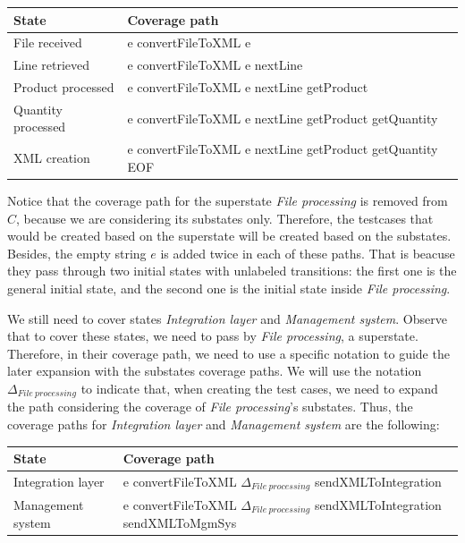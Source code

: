 \begin{center}
\begin{tabular}{| l | l|}

\hline

State & Coverage path \\ \hline

File received & e convertFileToXML e \\ \hline

Line retrieved & e convertFileToXML e nextLine\\ \hline

Product processed & e convertFileToXML e nextLine getProduct\\ \hline

Quantity processed & e convertFileToXML e nextLine getProduct getQuantity\\ \hline

XML creation & e convertFileToXML e nextLine getProduct getQuantity EOF\\ 

\hline
\end{tabular}
\end{center}

Notice that the coverage path for the superstate \textit{File processing} is removed from $C$, because we are considering its substates only. Therefore, the testcases that would be created based on the superstate will be created based on the substates. Besides, the empty string $e$ is added twice in each of these paths. That is beacuse they pass through two initial states with unlabeled transitions: the first one is the general initial state, and the second one is the initial state inside \textit{File processing}.

We still need to cover states \textit{Integration layer} and \textit{Management system}. Observe that to cover these states, we need to pass by \textit{File processing}, a superstate. Therefore, in their coverage path, we need to use a specific notation to guide the later expansion with the substates coverage paths. We will use the notation $\Delta_{File\ processing}$ to indicate that, when creating the test cases, we need to expand the path considering the coverage of \textit{File processing}'s substates. Thus, the coverage paths for \textit{Integration layer} and \textit{Management system} are the following:

\begin{center}
\begin{tabular}{| l | p{10cm}|}

\hline

State & Coverage path \\ \hline

Integration layer & e convertFileToXML $\Delta_{File\ processing}$ sendXMLToIntegration \\ \hline

Management system & e convertFileToXML $\Delta_{File\ processing}$ sendXMLToIntegration sendXMLToMgmSys\\

\hline
\end{tabular}
\end{center}

